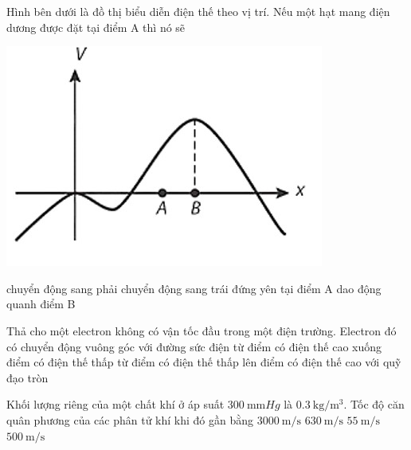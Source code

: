\begin{ex}
	Hình bên dưới là đồ thị biểu diễn điện thế theo vị trí. Nếu một hạt mang điện dương được đặt tại điểm A thì nó sẽ 
	\begin{center}
		\includegraphics[width=0.3\linewidth]{../figs/VN11-Y23-PH-SYL-036-P-1}
	\end{center}
	\choice
	{chuyển động sang phải}
	{\True chuyển động sang trái}
	{đứng yên tại điểm A}
	{dao động quanh điểm B}
\end{ex}
\begin{ex}
	Thả cho một electron không có vận tốc đầu trong một điện trường. Electron đó có chuyển động
	\choice
	{vuông góc với đường sức điện}
	{từ điểm có điện thế cao xuống điểm có điện thế thấp}
	{\True từ điểm có điện thế thấp lên điểm có điện thế cao}
	{với quỹ đạo tròn}
\end{ex}
\begin{ex}
	Khối lượng riêng của một chất khí ở áp suất $\SI{300}{\milli\meter Hg}$ là $\SI{0.3}{\kilogram/\meter^3}$. Tốc độ căn quân phương của các phân tử khí khi đó gần bằng
	\choice
	{$\SI{3000}{\meter/\second}$}
	{\True $\SI{630}{\meter/\second}$}
	{$\SI{55}{\meter/\second}$}
	{$\SI{500}{\meter/\second}$}
\end{ex}
